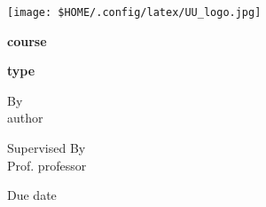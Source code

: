 \documentclass[12pt]{article}
\newcommand{\documentAuthor}{author}
\newcommand{\documentCourse}{course}
\newcommand{\documentType}{type}
\newcommand{\documentProfessor}{professor}
\newcommand{\documentDate}{date}
\begin{document}
\begin{titlepage}
    \begin{center}
        \texttt{[image: \$HOME/.config/latex/UU\_logo.jpg]} 
        \linebreak

        {\Large \textbf{\documentCourse}}

        {\Large \textbf{\documentType}}
        \linebreak

        {\footnotesize By}\\ 
        \documentAuthor


        \vspace{0.5cm}

        {\footnotesize Supervised By} \\
        Prof. \documentProfessor

        \vspace{0.5cm}

        Due \documentDate
    \end{center}
\end{titlepage}
\end{document}
